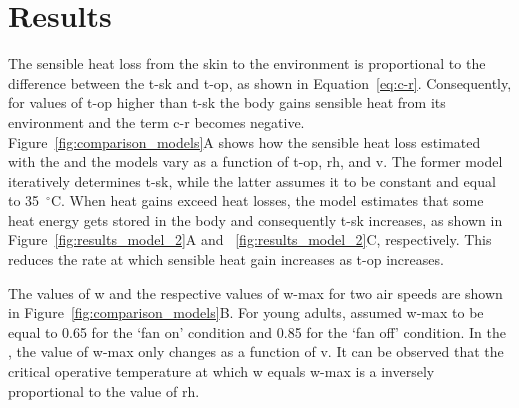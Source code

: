 

\section{Results}\label{sec:results}

The sensible heat loss from the skin to the environment is proportional to the difference between the \ac{t-sk} and \ac{t-op}, as shown in Equation~\ref{eq:c-r}.
Consequently, for values of \ac{t-op} higher than \ac{t-sk} the body gains sensible heat from its environment and the term \ac{c-r} becomes negative.
Figure~\ref{fig:comparison_models}A shows how the sensible heat loss estimated with the  and the  models vary as a function of \ac{t-op}, \ac{rh}, and \ac{v}.
The former model iteratively determines \ac{t-sk}, while the latter assumes it to be constant and equal to 35~$^{\circ}$C\@.
When heat gains exceed heat losses, the  model estimates that some heat energy gets stored in the body and consequently \ac{t-sk} increases, as shown in Figure~\ref{fig:results_model_2}A and ~\ref{fig:results_model_2}C, respectively.
This reduces the rate at which sensible heat gain increases as \ac{t-op} increases.

The values of \ac{w} and the respective values of \ac{w-max} for two air speeds are shown in Figure~\ref{fig:comparison_models}B\@.
For young adults,  assumed \ac{w-max} to be equal to 0.65 for the `fan on' condition and 0.85 for the `fan off' condition.
In the , the value of \ac{w-max} only changes as a function of \ac{v}.
It can be observed that the critical operative temperature at which \ac{w} equals \ac{w-max} is a inversely proportional to the value of \ac{rh}.

